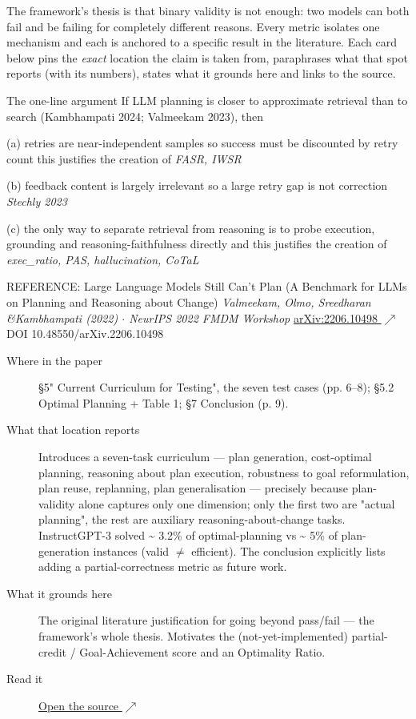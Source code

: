 The framework's thesis is that binary validity is not enough: two models can both fail and be failing for completely different reasons. Every metric isolates one mechanism and each is anchored to a specific result in the literature. Each card below pins the \emph{exact} location the claim is taken from, paraphrases what that spot reports (with its numbers), states what it grounds here and links to the source.

\begin{bmkeybox}{The one-line argument}
If LLM planning is closer to approximate retrieval than to search (Kambhampati 2024; Valmeekam 2023), then 

(a) retries are near-independent samples so success must be discounted by retry count this justifies the creation of \emph{FASR, IWSR}

(b) feedback content is largely irrelevant so a large retry gap is not correction \emph{Stechly 2023}

(c) the only way to separate retrieval from reasoning is to probe execution, grounding and reasoning-faithfulness directly and this justifies the creation of \emph{exec\_ratio, PAS, hallucination, CoTaL}


\end{bmkeybox}


\begin{bmmcard}{REFERENCE: Large Language Models Still Can't Plan (A Benchmark for LLMs on Planning and Reasoning about Change)}
\emph{Valmeekam, Olmo, Sreedharan \&Kambhampati (2022) \(\cdot\) NeurIPS 2022 FMDM Workshop}
\href{https://arxiv.org/abs/2206.10498}{arXiv:2206.10498 \(\nearrow\)} DOI 10.48550/arXiv.2206.10498
\begin{description}
\item[Where in the paper] \S{}5" Current Curriculum for Testing", the seven test cases (pp. 6--8); \S{}5.2 Optimal Planning + Table 1; \S{}7 Conclusion (p. 9).
\item[What that location reports] Introduces a seven-task curriculum --- plan generation, cost-optimal planning, reasoning about plan execution, robustness to goal reformulation, plan reuse, replanning, plan generalisation --- precisely because plan-validity alone captures only one dimension; only the first two are "actual planning", the rest are auxiliary reasoning-about-change tasks. InstructGPT-3 solved \textasciitilde{} 3.2\% of optimal-planning vs \textasciitilde{} 5\% of plan-generation instances (valid \(\neq\) efficient). The conclusion explicitly lists adding a partial-correctness metric as future work.
\item[What it grounds here] The original literature justification for going beyond pass/fail --- the framework's whole thesis. Motivates the (not-yet-implemented) partial-credit / Goal-Achievement score and an Optimality Ratio.
\item[Read it] \href{https://arxiv.org/abs/2206.10498}{Open the source \(\nearrow\)}
\end{description}
\end{bmmcard}

